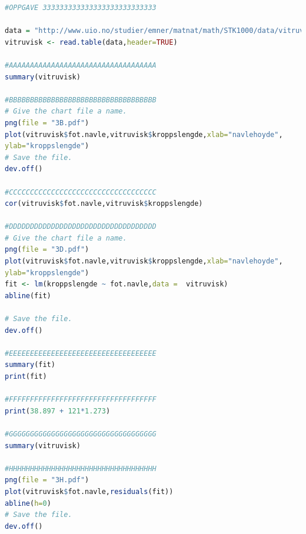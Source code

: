 \pagebreak
\begin{lstlisting}[language=R]
#OPPGAVE 333333333333333333333333333

data = "http://www.uio.no/studier/emner/matnat/math/STK1000/data/vitruvisk.txt"
vitruvisk <- read.table(data,header=TRUE)

#AAAAAAAAAAAAAAAAAAAAAAAAAAAAAAAAAAA
summary(vitruvisk)

#BBBBBBBBBBBBBBBBBBBBBBBBBBBBBBBBBBB
# Give the chart file a name.
png(file = "3B.pdf")
plot(vitruvisk$fot.navle,vitruvisk$kroppslengde,xlab="navlehoyde",
ylab="kroppslengde")
# Save the file.
dev.off()

#CCCCCCCCCCCCCCCCCCCCCCCCCCCCCCCCCCC
cor(vitruvisk$fot.navle,vitruvisk$kroppslengde)

#DDDDDDDDDDDDDDDDDDDDDDDDDDDDDDDDDDD
# Give the chart file a name.
png(file = "3D.pdf")
plot(vitruvisk$fot.navle,vitruvisk$kroppslengde,xlab="navlehoyde",
ylab="kroppslengde")
fit <- lm(kroppslengde ~ fot.navle,data =  vitruvisk)
abline(fit)

# Save the file.
dev.off()

#EEEEEEEEEEEEEEEEEEEEEEEEEEEEEEEEEEE
summary(fit)
print(fit)

#FFFFFFFFFFFFFFFFFFFFFFFFFFFFFFFFFFF
print(38.897 + 121*1.273)

#GGGGGGGGGGGGGGGGGGGGGGGGGGGGGGGGGGG
summary(vitruvisk)

#HHHHHHHHHHHHHHHHHHHHHHHHHHHHHHHHHHH
png(file = "3H.pdf")
plot(vitruvisk$fot.navle,residuals(fit))
abline(h=0)
# Save the file.
dev.off()
\end{lstlisting}

























